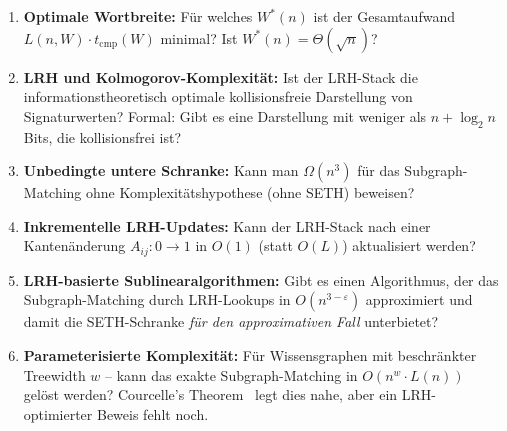 ﻿\documentclass[a4paper,12pt]{article}
\theoremstyle{definition}
\begin{document}
\begin{enumerate}
  \item \textbf{Optimale Wortbreite:} Für welches $W^*(n)$ ist der Gesamtaufwand
        $L(n,W) \cdot t_{\mathrm{cmp}}(W)$ minimal? Ist $W^*(n) = \Theta(\sqrt{n})$?

  \item \textbf{LRH und Kolmogorov-Komplexität:} Ist der LRH-Stack die
        informationstheoretisch optimale kollisionsfreie Darstellung von
        Signaturwerten? Formal: Gibt es eine Darstellung mit weniger als
        $n + \log_2 n$ Bits, die kollisionsfrei ist?

  \item \textbf{Unbedingte untere Schranke:} Kann man $\Omega(n^3)$ für das
        Subgraph-Matching ohne Komplexitätshypothese (ohne SETH) beweisen?

  \item \textbf{Inkrementelle LRH-Updates:} Kann der LRH-Stack nach einer
        Kantenänderung $A_{ij}: 0 \to 1$ in $O(1)$ (statt $O(L)$) aktualisiert werden?

  \item \textbf{LRH-basierte Sublinearalgorithmen:} Gibt es einen Algorithmus,
        der das Subgraph-Matching durch LRH-Lookups in $O(n^{3-\varepsilon})$
        approximiert und damit die SETH-Schranke \emph{für den approximativen Fall}
        unterbietet?

  \item \textbf{Parameterisierte Komplexität:} Für Wissensgraphen mit beschränkter
        Treewidth $w$ -- kann das exakte Subgraph-Matching in $O(n^w \cdot L(n))$
        gelöst werden? Courcelle's Theorem~\cite{courcelle1990} legt dies nahe, aber
        ein LRH-optimierter Beweis fehlt noch.
\end{enumerate}
\end{document}
